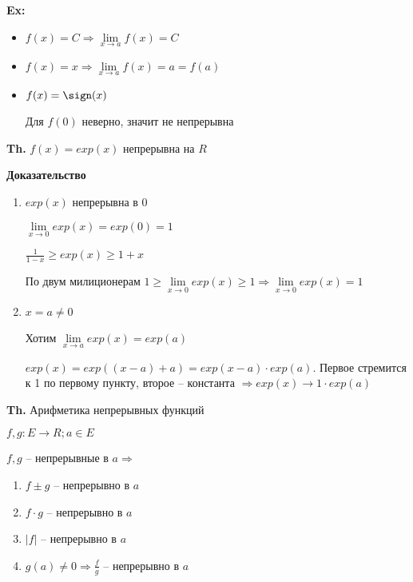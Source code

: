 \documentclass[14pt, letter paper]{article}
\begin{document}
\textbf{Ex:}

\begin{itemize}
    \item $f(x) = C \Rightarrow \lim\limits_{x \rightarrow a}{f(x)} = C$
    \item $f(x) = x \Rightarrow \lim\limits_{x \rightarrow a}{f(x)} = a = f(a)$
    \item $f(x) = \sign(x)$

    Для $f(0)$ неверно, значит не непрерывна
\end{itemize}

\textbf{Th.} $f(x) = exp(x)$ непрерывна на $R$

\begin{center}
    \textbf{Доказательство}
\end{center}

\begin{enumerate}
    \item $exp(x)$ непрерывна в $0$

    $\lim\limits_{x \rightarrow 0}{exp(x)} = exp(0) = 1$

    $\frac{1}{1-x} \geq exp(x) \geq 1 + x$

    По двум милиционерам $1 \geq \lim\limits_{x \rightarrow 0}{exp(x)} \geq 1 \Rightarrow \lim\limits_{x \rightarrow 0}{exp(x)} = 1$

    \item $x = a \neq 0$

    Хотим $\lim\limits_{x \rightarrow a}{exp(x)} = exp(a)$

    $exp(x) = exp((x - a) + a) = exp(x - a) \cdot exp(a)$. Первое стремится к 1 по первому пункту, второе -- константа $\Rightarrow exp(x) \rightarrow 1 \cdot exp(a)$
\end{enumerate}

\textbf{Th.} Арифметика непрерывных функций

$f, g : E \rightarrow R; a \in E$

$f, g$ -- непрерывные в $a \Rightarrow$

\begin{enumerate}
    \item $f \pm g$ -- непрерывно в $a$
    \item $f \cdot g$ -- непрерывно в $a$
    \item $|f|$ -- непрерывно в $a$
    \item $g(a) \neq 0 \Rightarrow \frac{f}{g}$ -- непрерывно в $a$
\end{enumerate}
\end{document}
